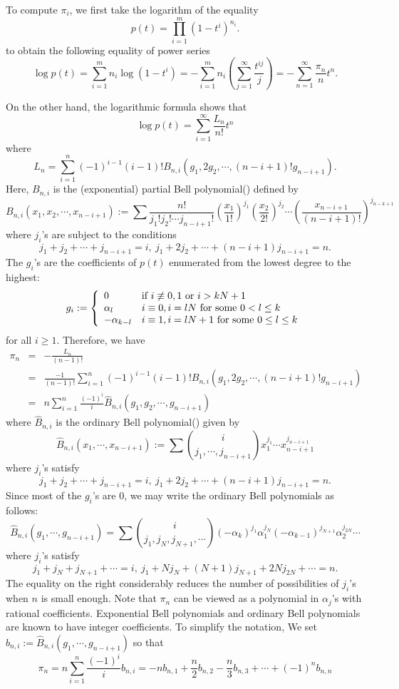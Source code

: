 \documentclass[reqno]{amsart}
\numberwithin{equation}{section}
\theoremstyle{plain}
\theoremstyle{definition}
\begin{document}
To compute $\pi_i$, we first take the logarithm of the equality 
$$p(t)=\prod^m_{i=1}(1-t^i)^{n_i}.$$
to obtain the following equality of power series
$$\log p(t)=\sum^m_{i=1}n_i\log(1-t^i)=-\sum^m_{i=1}n_i\left(\sum_{j=1}^\infty\frac{t^{ij}}{j}\right)=-\sum^\infty_{n=1}\frac{\pi_n}{n}t^n.$$

On the other hand, the logarithmic formula \cite[3.5 Theorem A]{Comtet} shows that
$$\log p(t)=\sum^\infty_{i=1}\frac{L_n}{n!}t^n$$
where
$$L_n=\sum^n_{i=1}(-1)^{i-1}(i-1)!B_{n, i}(g_1, 2g_2, \cdots, (n-i+1)!g_{n-i+1}).$$
Here, $B_{n, i}$ is the (exponential) partial Bell polynomial(\cite[3.3, p.133]{Comtet}) defined by
$$B_{n, i}(x_1, x_2, \cdots, x_{n-i+1}):=\sum\frac{n!}{j_1!j_2!\cdots j_{n-i+1}!}\left(\frac{x_1}{1!}\right)^{j_1}\left(\frac{x_2}{2!}\right)^{j_2}\cdots\left(\frac{x_{n-i+1}}{(n-i+1)!}\right)^{j_{n-k+1}}$$
where $j_i$'s are subject to the conditions
$$j_1+j_2+\cdots+j_{n-i+1}=i,\ j_1+2j_2+\cdots+(n-i+1)j_{n-i+1}=n.$$
The $g_i$'s are the coefficients of $p(t)$ enumerated from the lowest degree to the highest:
$$g_i 
:=\left\{\begin{array}{llll}
0     &  \text{if}\ i\centernot\equiv 0, 1\ \text{or}\ i>kN+1\\
\alpha_l     & i\equiv 0, i=lN\ \text{for some}\ 0< l\leq k\\
-\alpha_{k-l} & i\equiv 1, i=lN+1\ \text{for some}\ 0\leq l\leq k
\end{array}\right.$$
for all $i\geq 1$. Therefore, we have
\begin{eqnarray*}
\pi_n&=&-\frac{L_n}{(n-1)!}\\
&=&\frac{-1}{(n-1)!}\sum^n_{i=1}(-1)^{i-1}(i-1)!B_{n, i}(g_1, 2g_2, \cdots, (n-i+1)!g_{n-i+1})\\
&=&n\sum^n_{i=1}\frac{(-1)^i}{i}
\hat{B}_{n, i}(g_1, g_2, \cdots, g_{n-i+1})
\end{eqnarray*}
where $\hat{B}_{n, i}$ is the ordinary Bell polynomial(\cite[p.136]{Comtet}) given by
$$\hat{B}_{n, i}(x_1, \cdots, x_{n-i+1}):=\sum\binom{i}{j_1, \cdots, j_{n-i+1}}x^{j_1}_1\cdots x^{j_{n-i+1}}_{n-i+1}$$
where $j_i$'s satisfy
$$j_1+j_2+\cdots+j_{n-i+1}=i,\ j_1+2j_2+\cdots+(n-i+1)j_{n-i+1}=n.$$
Since most of the $g_i$'s are $0$, we may write the ordinary Bell polynomials as follows:
$$\hat{B}_{n, i}(g_1, \cdots, g_{n-i+1})=\sum\binom{i}{j_1, j_N, j_{N+1}, \cdots}(-\alpha_k)^{j_1}\alpha^{j_N}_1(-\alpha_{k-1})^{j_{N+1}}\alpha_2^{j_{2N}}\cdots$$
where $j_i$'s satisfy
$$j_1+j_N+j_{N+1}+\cdots=i,\ j_1+Nj_N+(N+1)j_{N+1}+2Nj_{2N}+\cdots=n.$$
The equality on the right considerably reduces the number of possibilities of $j_i$'s when $n$ is small enough. Note that $\pi_n$ can be viewed as a polynomial in $\alpha_j$'s with rational coefficients. Exponential Bell polynomials and ordinary Bell polynomials are known to have  integer coefficients. To simplify the notation, We set $b_{n, i}:=\hat{B}_{n, i}(g_1, \cdots, g_{n-i+1})$ so that
$$\pi_n=n\sum^n_{i=1}\frac{(-1)^i}{i}
b_{n, i}=-nb_{n, 1}+\frac{n}{2}b_{n, 2}-\frac{n}{3}b_{n, 3}+\cdots+(-1)^nb_{n, n}$$
\end{document}
